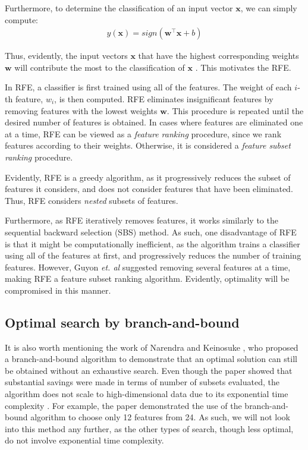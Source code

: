 \documentclass[12pt, twoside, a4paper]{report}
\def\vec{\boldsymbol}
\begin{document}
Furthermore, to determine the classification of an input vector $\vec{x}$, we can simply compute:
\begin{align*}
y(\vec{x}) = sign(\vec{w}^\top \vec{x} + b)
\end{align*}

Thus, evidently, the input vectors $\vec{x}$ that have the highest corresponding weights $\vec{w}$ will contribute the most to the classification of $\vec{x}$ \cite{RefWorks:229}. This motivates the RFE.

In RFE, a classifier is first trained using all of the features. The weight of each $i$-th feature, $w_i$, is then computed. RFE eliminates insignificant features by removing features with the lowest weights $\vec{w}$. This procedure is repeated until the desired number of features is obtained. In cases where features are eliminated one at a time, RFE can be viewed as a \textit{feature ranking} procedure, since we rank features according to their weights. Otherwise, it is considered a \textit{feature subset ranking} procedure.

Evidently, RFE is a greedy algorithm, as it progressively reduces the subset of features it considers, and does not consider features that have been eliminated. Thus, RFE considers \textit{nested} subsets of features.

Furthermore, as RFE iteratively removes features, it works similarly to the sequential backward selection (SBS) method. As such, one disadvantage of RFE is that it might be computationally inefficient, as the algorithm trains a classifier using all of the features at first, and progressively reduces the number of training features. However, Guyon \textit{et. al} suggested removing several features at a time, making RFE a feature subset ranking algorithm. Evidently, optimality will be compromised in this manner.


\subsection{Optimal search by branch-and-bound}
It is also worth mentioning the work of Narendra and Keinosuke \cite{RefWorks:176}, who proposed a branch-and-bound algorithm to demonstrate that an optimal solution can still be obtained without an exhaustive search. Even though the paper showed that substantial savings were made in terms of number of subsets evaluated, the algorithm does not scale to high-dimensional data \cite{RefWorks:178} due to its exponential time complexity \cite{RefWorks:190, RefWorks:189}. For example, the paper demonstrated the use of the branch-and-bound algorithm to choose only 12 features from 24. As such, we will not look into this method any further, as the other types of search, though less optimal, do not involve exponential time complexity.
\end{document}
